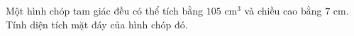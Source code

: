 \begin{bt}%
	Một hình chóp tam giác đều có thể tích bằng $105\text{ cm}^3$ và chiều cao bằng $7\text{ cm}$. Tính diện tích mặt đáy của hình chóp đó.
\end{bt}
